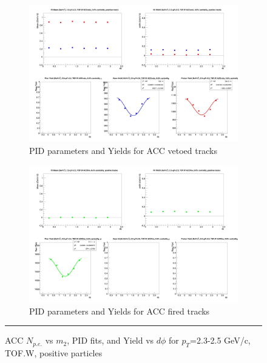\begin{figure}[H]
  \ContinuedFloat
    \begin{subfigure}{1\textwidth}
    \includegraphics[width=1\textwidth]{hiptfits/pos/fitParams_tof2_cent0_ch1_pT-23-25.jpg}
    \caption{PID parameters and Yields for ACC vetoed tracks}
    \end{subfigure}    
    \begin{subfigure}{1\textwidth}
    \includegraphics[width=1\textwidth]{hiptfits/pos/fitParams_tof3_cent0_ch1_pT-23-25.jpg}
    \caption{PID parameters and Yields for ACC fired tracks}
    \end{subfigure} 
    \rule{35em}{0.5pt}
  \caption[ACC $N_{p.e.}$ vs $m_2$, PID fits, and Yield vs $d\phi$ for $p_T$=2.3-2.5 GeV/c, TOF.W, positive particles]{ACC $N_{p.e.}$ vs $m_2$, PID fits, and Yield vs $d\phi$ for $p_T$=2.3-2.5 GeV/c, TOF.W, positive particles}
  \label{fig:acc23-25pos}
\end{figure}


